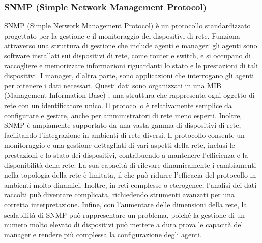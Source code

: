 \documentclass[target=bach,aauheader=,style=]{thud}
\begin{document}
\subsubsection{SNMP (Simple Network Management Protocol)} 
SNMP (Simple Network Management Protocol) \cite{rfc1157} è un protocollo standardizzato progettato per la gestione e il monitoraggio dei dispositivi di rete. Funziona attraverso una struttura di gestione che include agenti e manager: gli agenti sono software installati sui dispositivi di rete, come router e switch, e si occupano di raccogliere e memorizzare informazioni riguardanti lo stato e le prestazioni di tali dispositivi. I manager, d'altra parte, sono applicazioni che interrogano gli agenti per ottenere i dati necessari. Questi dati sono organizzati in una MIB (Management Information Base) \cite{rfc1213}, una struttura che rappresenta ogni oggetto di rete con un identificatore unico.
\newline
Il protocollo è relativamente semplice da configurare e gestire, anche per amministratori di rete meno esperti. Inoltre, SNMP è ampiamente supportato da una vasta gamma di dispositivi di rete, facilitando l'integrazione in ambienti di rete diversi. Il protocollo consente un monitoraggio e una gestione dettagliati di vari aspetti della rete, inclusi le prestazioni e lo stato dei dispositivi, contribuendo a mantenere l'efficienza e la disponibilità della rete.
\newline
La sua capacità di rilevare dinamicamente i cambiamenti nella topologia della rete è limitata, il che può ridurre l'efficacia del protocollo in ambienti molto dinamici. Inoltre, in reti complesse o eterogenee, l'analisi dei dati raccolti può diventare complicata, richiedendo strumenti avanzati per una corretta interpretazione. Infine, con l'aumentare delle dimensioni della rete, la scalabilità di SNMP può rappresentare un problema, poiché la gestione di un numero molto elevato di dispositivi può mettere a dura prova le capacità del manager e rendere più complessa la configurazione degli agenti.
\end{document}
